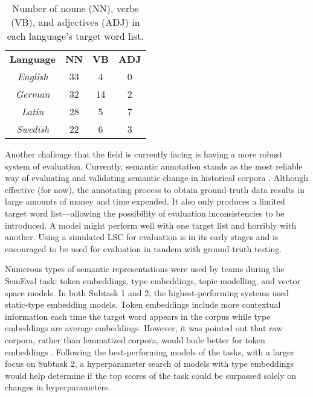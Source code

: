 \begin{table}[h]
\centering
\begin{tabular}{cccc} 
\toprule
\textbf{Language} & \textbf{NN} & \textbf{VB} & \textbf{ADJ}  \\
\textit{English}  & 33          & 4           & 0             \\
\textit{German}   & 32          & 14          & 2             \\
\textit{Latin}    & 28          & 5           & 7             \\
\textit{Swedish}  & 22          & 6           & 3             \\
\bottomrule
\end{tabular}
\caption{Number of nouns (NN), verbs (VB), and adjectives (ADJ) in each language's target word list.}
\label{tab:postag-breakdown}
\end{table}


Another challenge that the field is currently facing is having a more robust system of evaluation. Currently, semantic annotation stands as the most reliable way of evaluating and validating semantic change in historical corpora \citep{hengchen2021challenges}. Although effective (for now), the annotating process to obtain ground-truth data results in large amounts of money and time expended. It also only produces a limited target word list—allowing the possibility of evaluation inconsistencies to be introduced. A model might perform well with one target list and horribly with another. Using a simulated LSC for evaluation is in its early stages and is encouraged to be used for evaluation in tandem with ground-truth testing.

Numerous types of semantic representations were used by teams during the SemEval task: token embeddings, type embeddings, topic modelling, and vector space models. In both Subtask 1 and 2, the highest-performing systems used static-type embedding models. Token embeddings include more contextual information each time the target word appears in the corpus while type embeddings are average embeddings. However, it was pointed out that raw corpora, rather than lemmatized corpora, would bode better for token embeddings \citep{schlechtweg-etal-2020-semeval}. Following the best-performing models of the tasks, with a larger focus on Subtask 2, a hyperparameter search of models with type embeddings would help determine if the top scores of the task could be surpassed solely on changes in hyperparameters. 


